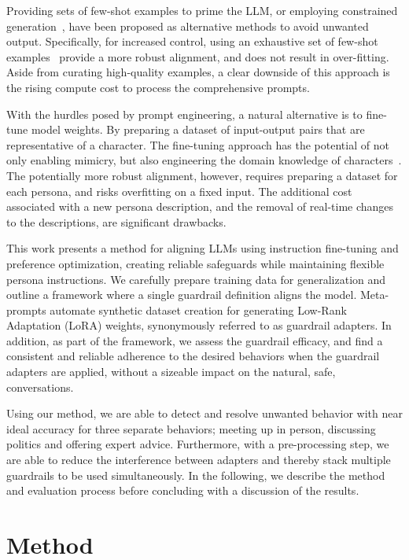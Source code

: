 \documentclass[letterpaper]{article}
\begin{document}
Providing sets of few-shot examples to prime the LLM, or employing constrained generation~\cite{loulasyntactic, zhao2024probabilistic, lew2023sequential}, have been proposed as alternative methods to avoid unwanted output. Specifically, for increased control, using an exhaustive set of few-shot examples~\cite{agarwal2024many} provide a more robust alignment, and does not result in over-fitting. 
Aside from curating high-quality examples, a clear downside of this approach is the rising compute cost to process the comprehensive prompts.

With the hurdles posed by prompt engineering, a natural alternative is to fine-tune model weights. By preparing a dataset of input-output pairs that are representative of a character. The fine-tuning approach has the potential of not only enabling mimicry, but also engineering the domain knowledge of characters~\cite{zhang2023instruction, shao2023character}.
The potentially more robust alignment, however, requires preparing a dataset for each persona, and risks overfitting on a fixed input. The additional cost associated with a new persona description, and the removal of real-time changes to the descriptions, are significant drawbacks.

This work presents a method for aligning LLMs using instruction fine-tuning and preference optimization, creating reliable safeguards while maintaining flexible persona instructions. We carefully prepare training data for generalization and outline a framework where a single guardrail definition aligns the model. Meta-prompts automate synthetic dataset creation for generating Low-Rank Adaptation (LoRA) weights, synonymously referred to as guardrail adapters.  
In addition, as part of the framework, we assess the guardrail efficacy, and find a consistent and reliable adherence to the desired behaviors when the guardrail adapters are applied, without a sizeable impact on the natural, safe, conversations.

Using our method, we are able to detect and resolve unwanted behavior with near ideal accuracy for three separate behaviors; meeting up in person, discussing politics and offering expert advice. Furthermore, with a pre-processing step, we are able to reduce the interference between adapters and thereby stack multiple guardrails to be used simultaneously. In the following, we describe the method and evaluation process before concluding with a discussion of the results.
\section{Method}
\end{document}

